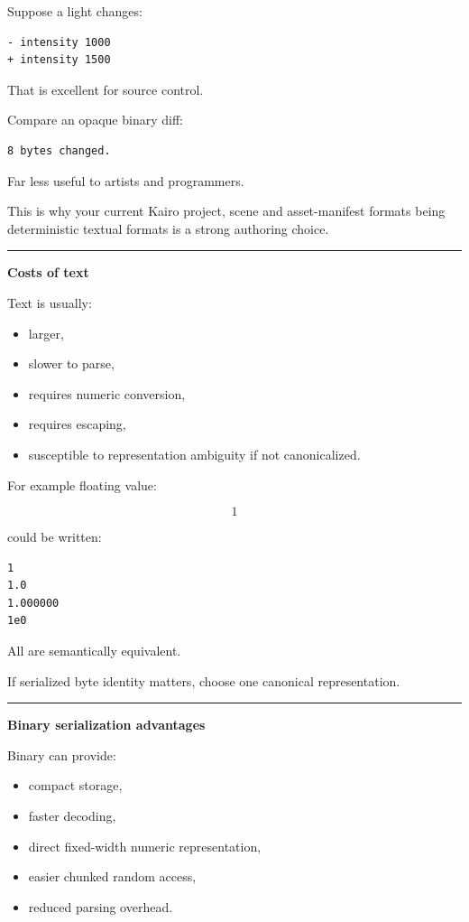 Suppose a light changes:

\begin{verbatim}
- intensity 1000
+ intensity 1500
\end{verbatim}

That is excellent for source control.

Compare an opaque binary diff:

\begin{verbatim}
8 bytes changed.
\end{verbatim}

Far less useful to artists and programmers.

This is why your current Kairo project, scene and asset-manifest formats being deterministic textual formats is a strong authoring choice.

\begin{center}\rule{0.5\linewidth}{0.5pt}\end{center}

\textbf{Costs of text}

Text is usually:

\begin{itemize}
\tightlist
\item
  larger,
\item
  slower to parse,
\item
  requires numeric conversion,
\item
  requires escaping,
\item
  susceptible to representation ambiguity if not canonicalized.
\end{itemize}

For example floating value:

\[
1
\]

could be written:

\begin{verbatim}
1
1.0
1.000000
1e0
\end{verbatim}

All are semantically equivalent.

If serialized byte identity matters, choose one canonical representation.

\begin{center}\rule{0.5\linewidth}{0.5pt}\end{center}

\textbf{Binary serialization advantages}

Binary can provide:

\begin{itemize}
\tightlist
\item
  compact storage,
\item
  faster decoding,
\item
  direct fixed-width numeric representation,
\item
  easier chunked random access,
\item
  reduced parsing overhead.
\end{itemize}

